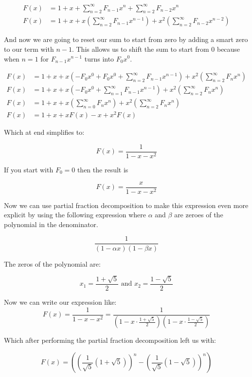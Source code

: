 \begin{align*}
    F(x) &= 1 + x + \sum_{n = 2}^{\infty} F_{n -1} x^{n} + \sum_{n = 2}^{\infty} F_{n - 2}x^n \\ 
    F(x) &= 1 + x + x \left( \sum_{n = 2}^{\infty} F_{n -1} x^{n-1}\right) + x^2 \left( \sum_{n = 2}^{\infty} F_{n -2} x^{n-2}\right)
\end{align*}

And now we are going to reset our sum to start from zero by adding a smart zero to our term with 
\(n - 1\). This allows us to shift the sum to start from 0 because when \(n = 1\) for 
\(F_{n - 1}x^{n - 1}\) turns into \(F_0 x^0\).

\begin{align*}
    F(x) &= 1 + x + x \left( -F_{0}x^0 + F_{0}x^0 + \sum_{n = 2}^{\infty} F_{n-1} x^{n-1}\right) + x^2 \left( \sum_{n = 2}^{\infty} F_{n} x^{n}\right)\\
    F(x) &= 1 + x + x \left( -F_{0}x^0 + \sum_{n = 1}^{\infty} F_{n-1} x^{n-1}\right) + x^2 \left( \sum_{n = 2}^{\infty} F_{n} x^{n}\right)\\
    F(x) &= 1 + x + x \left( \sum_{n = 0}^{\infty} F_{n} x^{n}\right) + x^2 \left( \sum_{n = 2}^{\infty} F_{n} x^{n}\right)\\
    F(x) &= 1 + x + x F(x) - x + x^2 F(x)
\end{align*}

Which at end simplifies to:

\[
    F(x) = \frac{1}{1 - x - x^2}
\]

If you start with \(F_0 = 0\) then the result  is

\[
    F(x) = \frac{x}{1 - x - x^2}
\]


Now we can use partial fraction decomposition to make this expression even more explicit
by using the following expression where \(\alpha\) and \(\beta\) are zeroes of the polynomial in the
denominator.

\[
    \frac{1}{\left(1 - \alpha x\right)\left(1 - \beta x\right)}
\]

The zeros of the polynomial are:

\[
    x_1 = \frac{1 + \sqrt{5}}{2} \text{ and }  x_2 = \frac{1 - \sqrt{5}}{2}    
\]


Now we can write our expression like:
\[
    F(x) = \frac{1}{1 - x - x^2} = \frac{1}{\left(1 - x \cdot \frac{1 + \sqrt{5}}{2}\right)\left(1 - x 
    \cdot \frac{1 - \sqrt{5}}{2}\right)}
\]

Which after performing the partial fraction decomposition left us with:

\[
    F(x) = \left( {\left( \frac{1}{\sqrt{5}} (1 + \sqrt{5}) \right)}^n - {\left( \frac{1}{\sqrt{5}} 
    (1 - \sqrt{5}) \right)}^n \right)
\]

\QED


